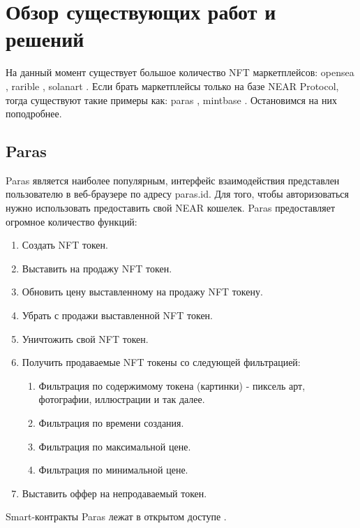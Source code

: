 \section{Обзор существующих работ и решений}
\label{section.theory}
На данный момент существует большое количество NFT маркетплейсов: opensea \cite{opensea}, rarible \cite{rarible}, solanart \cite{solanart}. Если брать маркетплейсы только на базе NEAR Protocol, тогда существуют такие примеры как: paras \cite{paras}, mintbase \cite{mintbase}. Остановимся на них поподробнее.

\subsection{Paras}
\label{section.theory.paras}

Paras является наиболее популярным, интерфейс взаимодействия представлен пользователю в веб-браузере по адресу paras.id. Для того, чтобы авторизоваться нужно использовать
предоставить свой NEAR кошелек. Paras предоставляет огромное количество функций:
\begin{enumerate}
    \item Создать NFT токен.
    \item Выставить на продажу NFT токен.
    \item Обновить цену выставленному на продажу NFT токену.
    \item Убрать с продажи выставленной NFT токен.
    \item Уничтожить свой NFT токен.
    \item Получить продаваемые NFT токены со следующей фильтрацией:
        \begin{enumerate}
            \item Фильтрация по содержимому токена (картинки) - пиксель арт, фотографии, иллюстрации и так далее.
            \item Фильтрация по времени создания.
            \item Фильтрация по максимальной цене.
            \item Фильтрация по минимальной цене.
        \end{enumerate}
    \item Выставить оффер на непродаваемый токен.
\end{enumerate}

Smart-контракты Paras лежат в открытом доступе \cite{parasnftcontract, parasmarketplacecontract}.

